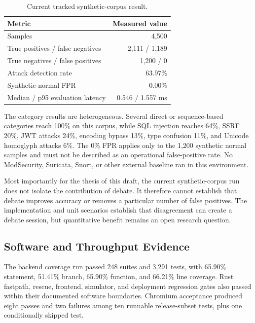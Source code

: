 \begin{table}[t]
  \centering
  \footnotesize
  \caption{Current tracked synthetic-corpus result.}
  \label{tab:public-corpus}
  \begin{tabular}{@{}lr@{}}
    \toprule
    Metric & Measured value \\
    \midrule
    Samples & 4,500 \\
    True positives / false negatives & 2,111 / 1,189 \\
    True negatives / false positives & 1,200 / 0 \\
    Attack detection rate & 63.97\% \\
    Synthetic-normal FPR & 0.00\% \\
    Median / p95 evaluation latency & 0.546 / 1.557 ms \\
    \bottomrule
  \end{tabular}
\end{table}

The category results are heterogeneous. Several direct or sequence-based categories reach 100\% on this corpus, while SQL injection reaches 64\%, SSRF 20\%, JWT attacks 24\%, encoding bypass 13\%, type confusion 11\%, and Unicode homoglyph attacks 6\%. The 0\% FPR applies only to the 1,200 synthetic normal samples and must not be described as an operational false-positive rate. No ModSecurity, Suricata, Snort, or other external baseline ran in this environment.

Most importantly for the thesis of this draft, the current synthetic-corpus run does not isolate the contribution of debate. It therefore cannot establish that debate improves accuracy or removes a particular number of false positives. The implementation and unit scenarios establish that disagreement can create a debate session, but quantitative benefit remains an open research question.

\subsection{Software and Throughput Evidence}

The backend coverage run passed 248 suites and 3,291 tests, with 65.90\% statement, 51.41\% branch, 65.90\% function, and 66.21\% line coverage. Rust fastpath, rescue, frontend, simulator, and deployment regression gates also passed within their documented software boundaries. Chromium acceptance produced eight passes and two failures among ten runnable release-subset tests, plus one conditionally skipped test.

